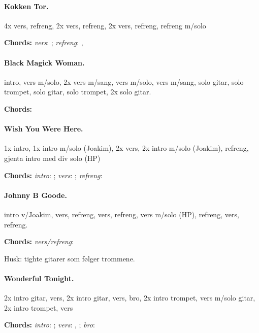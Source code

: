 \documentclass[%
twoside,                 %
final,                   %
10pt]{article}
\begin{document}
\paragraph{Kokken Tor.}
4x vers, refreng, 2x vers, refreng, 2x vers, refreng, refreng m/solo

\textbf{Chords:} \emph{vers}: ;
\emph{refreng}: , 





\paragraph{Black Magick Woman.}
intro, vers m/solo, 2x vers m/sang, vers m/solo, vers m/sang, solo gitar, solo trompet, solo gitar, solo trompet, 2x solo gitar.

\textbf{Chords:} 






\paragraph{Wish You Were Here.}
1x intro, 1x intro m/solo (Joakim), 2x vers, 2x intro m/solo (Joakim), refreng,
gjenta intro med div solo (HP)


\textbf{Chords:} \emph{intro}: ;
\emph{vers}: ; \emph{refreng}: 





\paragraph{Johnny B Goode.}
intro v/Joakim, vers, refreng, vers, refreng, vers m/solo (HP), refreng,
vers, refreng.

\textbf{Chords:} \emph{vers/refreng}: 

Husk: tighte gitarer som følger trommene.


\paragraph{Wonderful Tonight.}
2x intro gitar, vers, 2x intro gitar, vers, bro, 2x intro trompet, vers m/solo gitar, 2x intro trompet, vers

\textbf{Chords:} \emph{intro}: ;
\emph{vers}:
, ;
\emph{bro}: 
\end{document}
